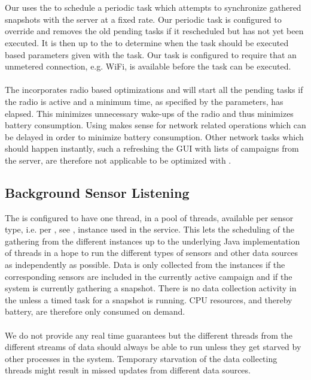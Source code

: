 \\\\
Our  uses the  to schedule a periodic task which attempts to synchronize gathered snapshots with the server at a fixed rate. Our periodic task is configured to override and removes the old pending tasks if it rescheduled but has not yet been executed. It is then up to the  to determine when the task should be executed based parameters given with the task. Our task is configured to require that an unmetered connection, e.g. WiFi, is available before the task can be executed. 
\\\\
The  incorporates radio based optimizations and will start all the pending tasks if the radio is active and a minimum time, as specified by the parameters, has elapsed. This minimizes unnecessary wake-ups of the radio and thus minimizes battery consumption. Using  makes sense for network related operations which can be delayed in order to minimize battery consumption. Other network tasks which should happen instantly, such a refreshing the GUI with lists of campaigns from the server, are therefore not applicable to be optimized with . 

\subsection{Background Sensor Listening}
The  is configured to have one thread, in a pool of threads, available per sensor type, i.e. per , see , instance used in the service. This lets the scheduling of the gathering from the different  instances up to the underlying Java implementation of threads in a hope to run the different types of sensors and other data sources as independently as possible. Data is only collected from the  instances if the corresponding sensors are included in the currently active campaign and if the system is currently gathering a snapshot. There is no data collection activity in the  unless a timed task for a snapshot is running. CPU resources, and thereby battery, are therefore only consumed on demand.
\\\\
We do not provide any real time guarantees but the different threads from the different streams of data should always be able to run unless they get starved by other processes in the system. Temporary starvation of the data collecting threads might result in missed updates from different data sources. 


